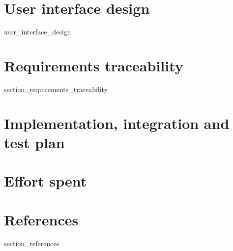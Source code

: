 \documentclass[a4paper]{article}
\begin{document}
\newpage
\section{User interface design}
{user_interface_design}

\newpage

\section{Requirements traceability}\label{requirements_traceability}

{section_requirements_traceability}

\newpage

\section{Implementation, integration and test plan}\label{implementation_integration_test_plan}

\newpage

\section{Effort spent}\label{effort_spent}

\section{References}\label{references}

{section_references}
\end{document}
